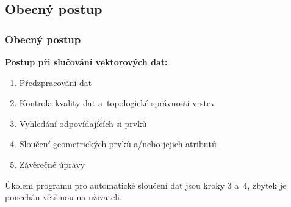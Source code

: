\documentclass[unicode,bookmarksnumbered]{beamer}
\begin{document}

  \subsection{Obecný postup}
  \begin{frame}
  \frametitle{Obecný postup}   %
     \textbf{Postup při slučování vektorových dat:}
     \begin{enumerate}
      \item Předzpracování dat%
      \item Kontrola kvality dat a~topologické správnosti vrstev
      \item Vyhledání odpovídajících si prvků
      \item Sloučení geometrických prvků a/nebo jejich atributů
      \item Závěrečné úpravy %
     \end{enumerate}
      \pause[]
     Úkolem programu pro automatické sloučení dat jsou kroky 3 a~4,
     zbytek je ponechán většinou na uživateli.
  \end{frame}
\end{document}
